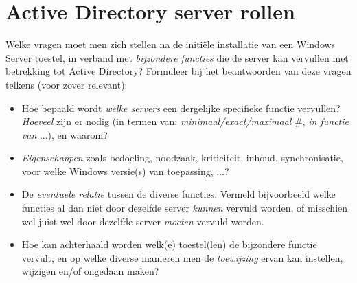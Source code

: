 	\section{Active Directory server rollen }
	Welke vragen moet men zich stellen na de initiële installatie van een Windows Server toestel, in verband met \textit{bijzondere functies} die de server kan vervullen met betrekking tot Active Directory? Formuleer bij het beantwoorden van deze vragen telkens (voor zover relevant): 
	\begin{itemize}
		\item  Hoe bepaald wordt \textit{welke servers} een dergelijke specifieke functie vervullen? \textit{Hoeveel} zijn er nodig (in termen van: \textit{minimaal/exact/maximaal} \#, \textit{in functie van} ...), en waarom?
		\item  \textit{Eigenschappen} zoals bedoeling, noodzaak, kriticiteit, inhoud, synchronisatie, voor welke Windows versie(s) van toepassing, ...? 
		\item  De \textit{eventuele relatie} tussen de diverse functies. Vermeld bijvoorbeeld welke functies al dan niet door dezelfde server \textit{kunnen} vervuld worden, of misschien wel juist wel door dezelfde server \textit{moeten} vervuld worden. 
		\item  Hoe kan achterhaald worden welk(e) toestel(len) de bijzondere functie vervult, en op welke diverse manieren men de \textit{toewijzing} ervan kan instellen, wijzigen en/of ongedaan maken? 
		
		
	\end{itemize}	